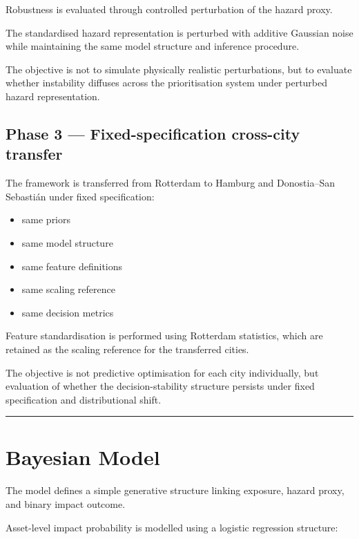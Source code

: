 \documentclass[
]{article}
\providecommand{\tightlist}{%
  \setlength{\itemsep}{0pt}\setlength{\parskip}{0pt}}
\begin{document}
Robustness is evaluated through controlled perturbation of the hazard
proxy.

The standardised hazard representation is perturbed with additive
Gaussian noise while maintaining the same model structure and inference
procedure.

The objective is not to simulate physically realistic perturbations, but
to evaluate whether instability diffuses across the prioritisation
system under perturbed hazard representation.

\subsection{Phase 3 — Fixed-specification cross-city
transfer}\label{phase-3-fixed-specification-cross-city-transfer}

The framework is transferred from Rotterdam to Hamburg and Donostia–San
Sebastián under fixed specification:

\begin{itemize}
\tightlist
\item
  same priors
\item
  same model structure
\item
  same feature definitions
\item
  same scaling reference
\item
  same decision metrics
\end{itemize}

Feature standardisation is performed using Rotterdam statistics, which
are retained as the scaling reference for the transferred cities.

The objective is not predictive optimisation for each city individually,
but evaluation of whether the decision-stability structure persists
under fixed specification and distributional shift.

\begin{center}\rule{0.5\linewidth}{0.5pt}\end{center}

\section{Bayesian Model}\label{bayesian-model}

The model defines a simple generative structure linking exposure, hazard
proxy, and binary impact outcome.

Asset-level impact probability is modelled using a logistic regression
structure:
\end{document}
